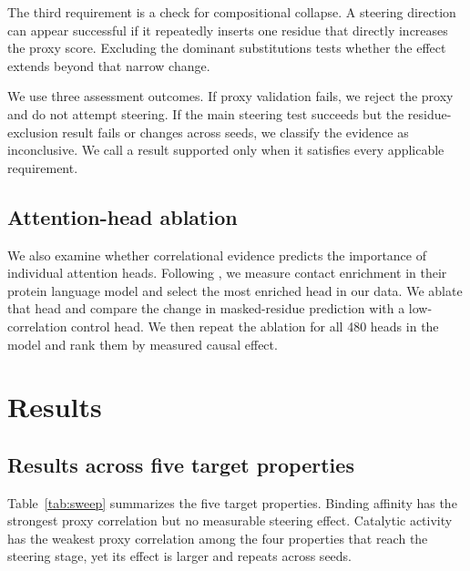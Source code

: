 \documentclass{article}
\begin{document}
The third requirement is a check for compositional collapse. A steering
direction can appear successful if it repeatedly inserts one residue
that directly increases the proxy score. Excluding the dominant
substitutions tests whether the effect extends beyond that narrow
change.

We use three assessment outcomes. If proxy validation fails, we reject
the proxy and do not attempt steering. If the main steering test
succeeds but the residue-exclusion result fails or changes across seeds,
we classify the evidence as inconclusive. We call a result supported
only when it satisfies every applicable requirement.

\subsection{Attention-head ablation}

We also examine whether correlational evidence predicts the importance
of individual attention heads. Following \citet{vig2021bertology}, we
measure contact enrichment in their protein language model and select
the most enriched head in our data. We ablate that head and compare the
change in masked-residue prediction with a low-correlation control head.
We then repeat the ablation for all 480 heads in the model and rank them
by measured causal effect.

\section{Results}
\label{sec:results}

\subsection{Results across five target properties}

Table~\ref{tab:sweep} summarizes the five target properties. Binding
affinity has the strongest proxy correlation but no measurable steering
effect. Catalytic activity has the weakest proxy correlation among the
four properties that reach the steering stage, yet its effect is larger
and repeats across seeds.
\end{document}
